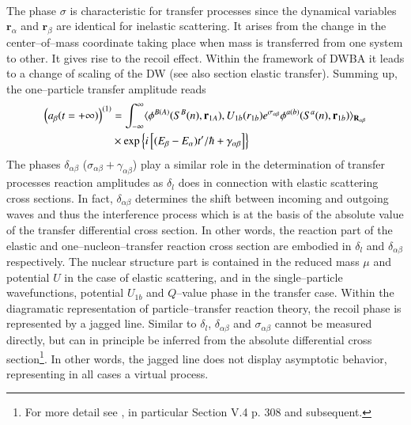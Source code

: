\begin{subappendices}
\begin{align}
\end{align} 
 The phase $\sigma$ is characteristic for transfer processes since the dynamical variables $\mathbf r_\alpha$ and $\mathbf r_\beta$ are identical for inelastic scattering. It arises from the change in the center--of--mass coordinate taking place when mass is transferred from one system to other. It gives rise to the recoil effect. Within the framework of DWBA it leads to a change of scaling of the DW (see also section elastic transfer). Summing up, the one--particle transfer amplitude reads
 \begin{align}\label{eq1.D.37}
\nonumber \left(a_\beta(t=+\infty)\right)^{(1)}&=\int_{-\infty}^{\infty}\langle {\phi^{B(A)}(S^B(n),\mathbf r_{1A}),U_{1b}(r_{1b})e^{\sigma_{\alpha\beta}}\phi^{a(b)}(S^a(n),\mathbf r_{1b})} \rangle_{\mathbf R_{\alpha\beta}}\\
&\times\exp\left\{i\left[(E_\beta-E_\alpha)t'/\hbar+\gamma_{\alpha\beta}\right]\right\}
 \end{align}
 The phases $\delta_{\alpha\beta}$ ($\sigma_{\alpha\beta}+\gamma_{\alpha\beta}$) play a similar role in the determination of transfer processes reaction amplitudes as $\delta_l$ does in connection with elastic scattering cross sections. In fact, $\delta_{\alpha\beta}$ determines the shift between incoming and outgoing waves and thus the interference process which is at the basis of the absolute value of the transfer differential cross section. In other words, the reaction part of the elastic and one--nucleon--transfer reaction cross section are embodied in $\delta_l$ and $\delta_{\alpha\beta}$ respectively. The nuclear structure part is contained in the reduced mass $\mu$ and potential $U$ in the case of elastic scattering, and in the single--particle wavefunctions, potential $U_{1b}$ and $Q$--value phase in the transfer case. Within the diagramatic representation of particle--transfer reaction theory, the recoil phase is represented by a jagged line. Similar to $\delta_l$, $\delta_{\alpha\beta}$  and $\sigma_{\alpha\beta}$ cannot be measured directly, but can in principle  be inferred from the absolute differential cross section\footnote{For more detail see \cite{Broglia:04a}, in particular Section V.4 p. 308 and subsequent.}. In other words, the jagged line does not display asymptotic behavior, representing in all cases a virtual process.  
 
 
 

\end{subappendices}
